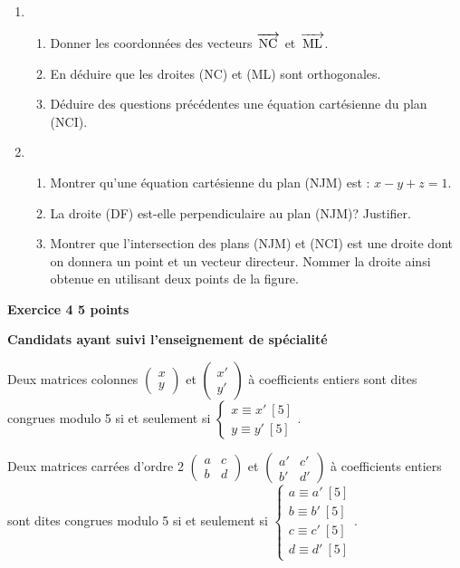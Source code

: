 \documentclass[10pt]{article}
\newcommand{\vect}[1]{\overrightarrow{\,\mathstrut#1\,}}
\begin{document}
\medskip

\begin{enumerate}[resume]
	\item 
		\begin{enumerate}
			\item Donner les coordonnées des vecteurs $ \vect{\text{NC}} $ et $ \vect{\text{ML}} $.			
			\item En déduire que les droites (NC) et (ML) sont orthogonales.			
			\item Déduire des questions précédentes une équation cartésienne du plan (NCI).
	\end{enumerate}	
\item 
\begin{enumerate}
		\item Montrer qu'une équation cartésienne du plan (NJM) est : $x - y + z = 1 $.		
		\item La droite (DF) est-elle perpendiculaire au plan (NJM)? Justifier.		
		\item Montrer que l'intersection des plans (NJM) et (NCI) est une droite dont on donnera un point et un vecteur directeur. 
Nommer la droite ainsi obtenue en utilisant deux points de la figure.
	\end{enumerate}
\end{enumerate}

\vspace{5mm}

\textbf{Exercice 4 \hfill 5 points} 

\textbf{Candidats ayant suivi l’enseignement de spécialité}

\medskip


Deux matrices colonnes $\begin{pmatrix} x\\y \end{pmatrix}$ et $\begin{pmatrix} x'\\y' \end{pmatrix}$ à coefficients entiers sont dites congrues modulo 5 si et seulement si $\left\{\begin{array}{l} x \equiv x'~[5]\\ y\equiv y'~[5]  \end{array} \right.$.


Deux matrices carrées d'ordre 2 $\begin{pmatrix} a&c\\b&d \end{pmatrix}$ et $\begin{pmatrix} a'&c'\\b'&d' \end{pmatrix}$ à coefficients entiers sont dites congrues modulo 5 si et seulement si $\left\{\begin{array}{l} a \equiv a'~[5]\\ b\equiv b'~[5] \\c \equiv c'~[5]\\ d\equiv d'~[5] \end{array} \right.$.
\end{document}
